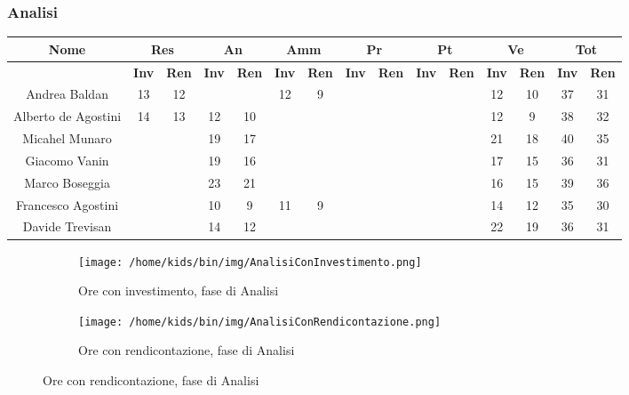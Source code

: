 \documentclass{scalatekids-article}
\begin{document}
\subsubsection{Analisi}
\begin{tabular}{| c | c  c | c  c | c  c | c  c | c  c | c  c | c  c |}
  \hline
  \textbf{Nome} & \multicolumn{2}{|c|}{\textbf{Res}} & \multicolumn{2}{|c|}{\textbf{An}} & \multicolumn{2}{|c|}{\textbf{Amm}} & \multicolumn{2}{|c|}{\textbf{Pr}} & \multicolumn{2}{|c|}{\textbf{Pt}} & \multicolumn{2}{|c|}{\textbf{Ve}} & \multicolumn{2}{|c|}{\textbf{Tot}}\\
  \hline
  & \textbf{Inv} & \textbf{Ren} & \textbf{Inv} & \textbf{Ren} & \textbf{Inv} & \textbf{Ren} & \textbf{Inv} & \textbf{Ren} & \textbf{Inv} & \textbf{Ren} & \textbf{Inv} & \textbf{Ren} & \textbf{Inv} & \textbf{Ren}\\
  \hline
  Andrea Baldan & 13 & 12 & & & 12 & 9 & & & & & 12 & 10 & 37 & 31\\
  Alberto de Agostini & 14 & 13 & 12 & 10 & & & & & & & 12 & 9 & 38 & 32\\
  Micahel Munaro & & & 19 & 17 & & & & & & & 21 & 18 & 40 & 35\\
  Giacomo Vanin & & & 19 & 16 & & & & & & & 17 & 15 & 36 & 31\\
  Marco Boseggia & & & 23 & 21 & & & & & & & 16 & 15 & 39 & 36\\
  Francesco Agostini & & & 10 & 9 & 11 & 9 & & & & & 14 & 12 & 35 & 30\\
  Davide Trevisan & & & 14 & 12 & & & & & & & 22 & 19 & 36 & 31\\
  \hline
\end{tabular}
\begin{figure}[h]
  \begin{subfigure}[b]{0.47\textwidth}
    \texttt{[image: /home/kids/bin/img/AnalisiConInvestimento.png]}
    \caption{Ore con investimento, fase di Analisi}
  \end{subfigure}
  \qquad
  \begin{subfigure}[b]{0.47\textwidth}
    \texttt{[image: /home/kids/bin/img/AnalisiConRendicontazione.png]}
    \caption{Ore con rendicontazione, fase di Analisi}
  \end{subfigure}
\end{figure}
\end{document}
